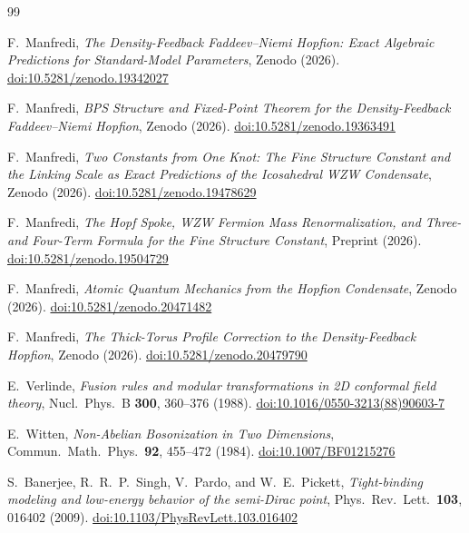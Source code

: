 \documentclass[11pt,a4paper]{article}
\theoremstyle{definition}
\theoremstyle{remark}
\begin{document}
\begin{thebibliography}{99}

F.~Manfredi,
\textit{The Density-Feedback Faddeev--Niemi Hopfion:
  Exact Algebraic Predictions for Standard-Model Parameters},
Zenodo (2026).
\href{https://doi.org/10.5281/zenodo.19342027}{doi:10.5281/zenodo.19342027}

F.~Manfredi,
\textit{BPS Structure and Fixed-Point Theorem for the
  Density-Feedback Faddeev--Niemi Hopfion},
Zenodo (2026).
\href{https://doi.org/10.5281/zenodo.19363491}{doi:10.5281/zenodo.19363491}

F.~Manfredi,
\textit{Two Constants from One Knot: The Fine Structure Constant and
  the Linking Scale as Exact Predictions of the Icosahedral WZW Condensate},
Zenodo (2026).
\href{https://doi.org/10.5281/zenodo.19478629}{doi:10.5281/zenodo.19478629}

F.~Manfredi,
\textit{The Hopf Spoke, WZW Fermion Mass Renormalization,
  and Three- and Four-Term Formula for the Fine Structure Constant},
Preprint (2026).
\href{https://doi.org/10.5281/zenodo.19504729}{doi:10.5281/zenodo.19504729}

F.~Manfredi,
\textit{Atomic Quantum Mechanics from the Hopfion Condensate},
Zenodo (2026).
\href{https://doi.org/10.5281/zenodo.20471482}{doi:10.5281/zenodo.20471482}

F.~Manfredi,
\textit{The Thick-Torus Profile Correction to the Density-Feedback Hopfion},
Zenodo (2026).
\href{https://doi.org/10.5281/zenodo.20479790}{doi:10.5281/zenodo.20479790}

E.~Verlinde,
\textit{Fusion rules and modular transformations in 2D conformal field theory},
Nucl.\ Phys.\ B \textbf{300}, 360--376 (1988).
\href{https://doi.org/10.1016/0550-3213(88)90603-7}{doi:10.1016/0550-3213(88)90603-7}

E.~Witten,
\textit{Non-Abelian Bosonization in Two Dimensions},
Commun.\ Math.\ Phys.\ \textbf{92}, 455--472 (1984).
\href{https://doi.org/10.1007/BF01215276}{doi:10.1007/BF01215276}

S.~Banerjee, R.~R.~P.~Singh, V.~Pardo, and W.~E.~Pickett,
\textit{Tight-binding modeling and low-energy behavior of the semi-Dirac point},
Phys.\ Rev.\ Lett.\ \textbf{103}, 016402 (2009).
\href{https://doi.org/10.1103/PhysRevLett.103.016402}{doi:10.1103/PhysRevLett.103.016402}


\end{thebibliography}
\end{document}
